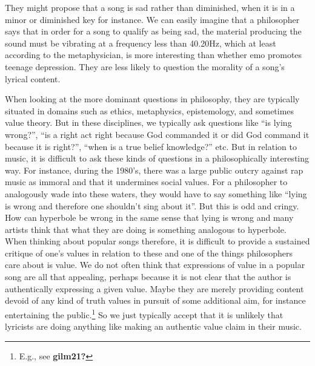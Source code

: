 \documentclass[
  12pt,
]{book}
\theoremstyle{definition}
\theoremstyle{definition}
\theoremstyle{definition}
\theoremstyle{definition}
\theoremstyle{remark}
\begin{document}
They might propose that a song is sad rather than diminished, when it is in a minor or diminished key for instance. We can easily imagine that a philosopher says that in order for a song to qualify as being sad, the material producing the sound must be vibrating at a frequency less than 40.20Hz, which at least according to the metaphysician, is more interesting than whether emo promotes teenage depression. They are less likely to question the morality of a song's lyrical content.

When looking at the more dominant questions in philosophy, they are typically situated in domains such as ethics, metaphysics, epistemology, and sometimes value theory. But in these disciplines, we typically ask questions like ``is lying wrong?'', ``is a right act right because God commanded it or did God command it because it is right?'', ``when is a true belief knowledge?'' etc. But in relation to music, it is difficult to ask these kinds of questions in a philosophically interesting way. For instance, during the 1980's, there was a large public outcry against rap music as immoral and that it undermines social values. For a philosopher to analogously wade into these waters, they would have to say something like ``lying is wrong and therefore one shouldn't sing about it''. But this is odd and cringy. How can hyperbole be wrong in the same sense that lying is wrong and many artists think that what they are doing is something analogous to hyperbole. When thinking about popular songs therefore, it is difficult to provide a sustained critique of one's values in relation to these and one of the things philosophers care about is value. We do not often think that expressions of value in a popular song are all that appealing, perhaps because it is not clear that the author is authentically expressing a given value. Maybe they are merely providing content devoid of any kind of truth values in pursuit of some additional aim, for instance entertaining the public.\footnote{E.g., see \textbf{gilm21?}} So we just typically accept that it is unlikely that lyricists are doing anything like making an authentic value claim in their music.
\end{document}

